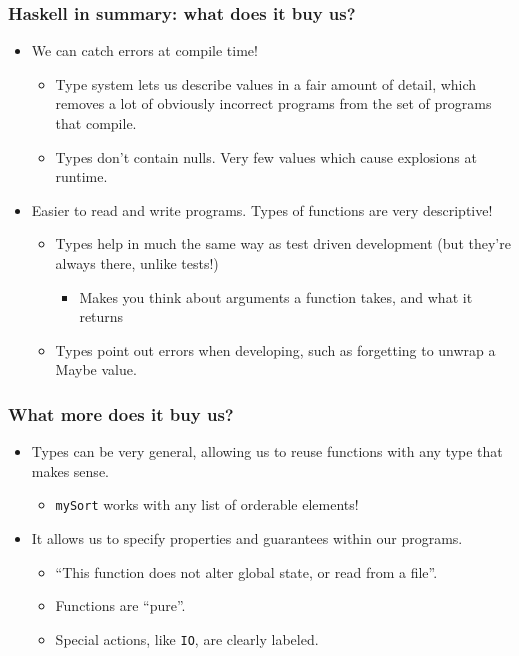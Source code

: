 \documentclass{beamer}
\begin{document}
\begin{frame}
  \frametitle{Haskell in summary: what does it buy us?}

  \begin{itemize}
  \item We can catch errors at compile time!
    \begin{itemize}
    \item Type system lets us describe values in a fair amount of detail, which removes a lot of obviously incorrect programs from the set of programs that compile.
    \item Types don't contain nulls. Very few values which cause explosions at runtime.
    \end{itemize}
  \item Easier to read and write programs. Types of functions are very descriptive!
    \begin{itemize}
    \item Types help in much the same way as test driven development (but they're always there, unlike tests!)
      \begin{itemize}
      \item Makes you think about arguments a function takes, and what it returns
      \end{itemize}
    \item Types point out errors when developing, such as forgetting to unwrap a Maybe value.
    \end{itemize}
  \end{itemize}
\end{frame}

\begin{frame}
  \frametitle{What more does it buy us?}
  \begin{itemize}
  \item Types can be very general, allowing us to reuse functions with any type that makes sense.
    \begin{itemize}
    \item \texttt{mySort} works with any list of orderable elements!
    \end{itemize}
  \item It allows us to specify properties and guarantees within our programs.
    \begin{itemize}
    \item ``This function does not alter global state, or read from a file''.
    \item Functions are ``pure''.
    \item Special actions, like \texttt{IO}, are clearly labeled.
    \end{itemize} 
  \end{itemize}
\end{frame}
\end{document}
